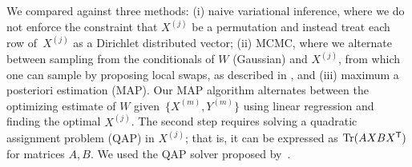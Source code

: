\documentclass{article}
\begin{document}
We compared against three methods: (i) naive
variational inference, where we do not enforce the constraint that
$X^{(j)}$ be a permutation and instead treat each row of~$X^{(j)}$ as
a Dirichlet distributed vector; (ii) MCMC, where we alternate between
sampling from the conditionals of $W$ (Gaussian) and ${X^{(j)}}$, from
which one can sample by proposing local swaps, as described in
\cite{Diaconis2009}, and (iii) maximum a posteriori estimation (MAP).
Our MAP algorithm alternates between the optimizing estimate of $W$ given~$\{X^{(m)}, Y^{(m)}\}$ using linear regression and finding the optimal ${X^{(j)}}$. The second step requires solving a quadratic assignment
problem (QAP) in ${X^{(j)}}$; that is, it can be expressed as
$\mathrm{Tr}(AXBX^{\mathsf{T}})$ for matrices $A,B$. We used the QAP solver
proposed by~\citet{Vogelstein2015}.
\end{document}
